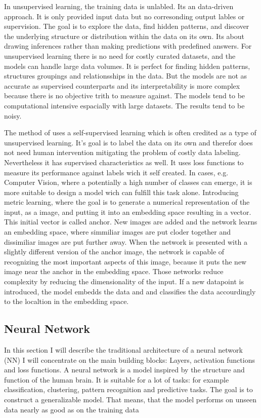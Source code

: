 In unsupervised learning, the training data is unlabled. 
Its an data-driven approach.
It is only provided input data but no corresonding output lables or supervision.
The goal is to explore the data, find hidden patterns, and discover the underlying structure or distribution within the data on its own.
Its about drawing inferences rather than making predictions with predefined answers.
For unsupervised learning there is no need for costly curated datasets, and the models can handle large data volumes.
It is perfect for finding hidden patterns, structures groupings and relationsships in the data.
But the models are not as accurate as supervised counterparts and its interpretability is more complex because there is no objective trith to measure against.
The models tend to be computational intensive espacially with large datasets. The results tend to be noisy.
\cite[p.4]{sarker2021machine}


The method of \citet{shenkar2022anomaly} uses a self-supervised learning which is often credited as a type of unsupervised learning.
It's goal is to label the data on its own and therefor does not need human intervention mitigating the problem of costly data labeling.
Nevertheless it has supervised characteristics as well.
It uses loss functions to measure its performance against labels wich it self created.
In cases, e.g. Computer Vision, where a potentially a high number of classes can emerge, it is more suitable to design a model wich can fulfill this task alone. 
Introducing metric learning, where the goal is to generate a numerical representation of the input, as a image, and putting it into an embedding space resulting in a vector.
This initial vector is called anchor. New images are added and the network learns an embedding space, where simmiliar images are put cloder together and dissimiliar 
images are put further away. When the network is presented with a slightly different version of the anchor image, the network is capable of recognizing the most important 
aspects of this image, because it puts the new image near the anchor in the embedding space.  
Those networks reduce complexity by reducing the dimensionality of the input.
If a new datapoint is introduced, the model embedds the data and and classifies the data accourdingly to the localtion in the embedding space. 
\citep{raina2007self}


\subsection{Neural Network}
In this section I will describe the traditional architecture of a neural network (NN)
I will concentrate on the main building blocks: Layers, activation functions and loss functions. 
A neural network is a model inspired by the structure and function of the human brain. 
It is suitable for a lot of tasks: for example classification, clustering, pattern recognition and predictive tasks.
The goal is to construct a generalizable model.
That means, that the model performs on unseen data nearly as good as on the training data 



